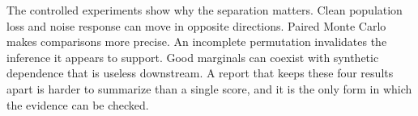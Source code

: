 \documentclass[10pt,twocolumn]{article}
\begin{document}
The controlled experiments show why the separation matters. Clean population loss and noise response can move in opposite directions. Paired Monte Carlo makes comparisons more precise. An incomplete permutation invalidates the inference it appears to support. Good marginals can coexist with synthetic dependence that is useless downstream. A report that keeps these four results apart is harder to summarize than a single score, and it is the only form in which the evidence can be checked.



\end{document}

